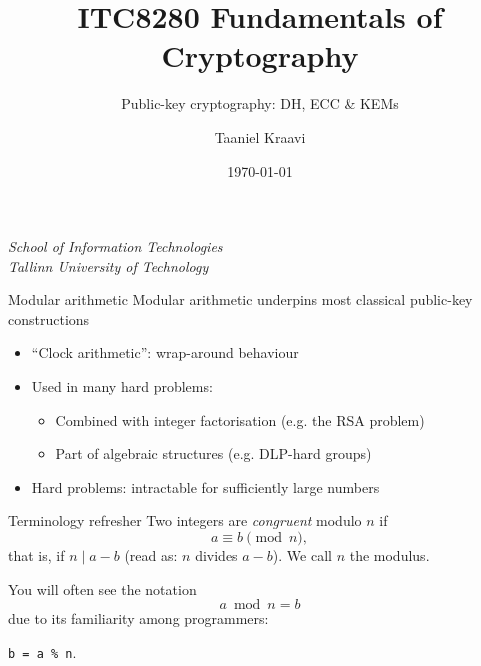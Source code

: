 \graphicspath{ {../../images/} }
\usetikzlibrary{external,arrows.meta}
\usepackage{caption}
\usepackage{pgfplots}
\usepackage{changepage}

\title{ITC8280 Fundamentals of Cryptography}
\subtitle{Public-key cryptography: DH, ECC \& KEMs}
\date{\today}
\author{Taaniel Kraavi}
\institute%
{%
  \textit{School of Information Technologies}\\
  \textit{Tallinn University of Technology}
}


\begin{frame}
  \titlepage
\end{frame}

\begin{frame}{Modular arithmetic}
  Modular arithmetic underpins most classical public-key constructions
  \begin{itemize}[<+(1)->]
    \item \enquote{Clock arithmetic}: wrap-around behaviour
    \item Used in many hard problems:
    \begin{itemize}
      \item Combined with integer factorisation (e.g. the RSA problem)
      \item Part of algebraic structures (e.g. DLP-hard groups)
    \end{itemize}
    \item Hard problems: intractable for sufficiently large numbers
  \end{itemize}
\end{frame}

\begin{frame}{Terminology refresher}
  Two integers are \emph{congruent} modulo $n$ if
  \[
    a \equiv b \pmod{n},
  \]
  \pause
  that is, if $n \mid a - b$ (read as: $n$ divides $a-b$).
  \pause
  We call $n$ the \alert{modulus}.

  \vspace*{1em}

  \pause
  You will often see the notation
  \[
    a \bmod n = b
  \]
  due to its familiarity among programmers:
  \begin{center}
    \texttt{b = a \% n}.
  \end{center}
\end{frame}


